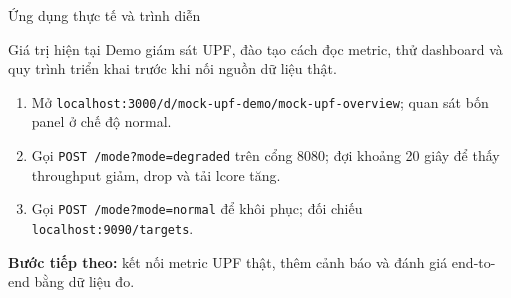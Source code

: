 \documentclass[aspectratio=169,11pt]{beamer}
\newcommand{\code}[1]{\texttt{#1}}
\begin{document}
\begin{frame}{Ứng dụng thực tế và trình diễn}
\begin{block}{Giá trị hiện tại}
Demo giám sát UPF, đào tạo cách đọc metric, thử dashboard và quy trình triển khai trước khi nối nguồn dữ liệu thật.
\end{block}
\begin{enumerate}
\item Mở \code{localhost:3000/d/mock-upf-demo/mock-upf-overview}; quan sát bốn panel ở chế độ normal.
\item Gọi \code{POST /mode?mode=degraded} trên cổng 8080; đợi khoảng 20 giây để thấy throughput giảm, drop và tải lcore tăng.
\item Gọi \code{POST /mode?mode=normal} để khôi phục; đối chiếu \code{localhost:9090/targets}.
\end{enumerate}
\vspace{0.2cm}
\small\textbf{Bước tiếp theo:} kết nối metric UPF thật, thêm cảnh báo và đánh giá end-to-end bằng dữ liệu đo.
\end{frame}
\end{document}
